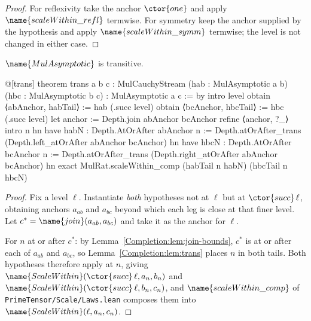 \begin{proof}
For reflexivity take the anchor $\ctor{one}$ and apply
$\name{scaleWithin\_refl}$ termwise.  For symmetry keep the anchor supplied by
the hypothesis and apply $\name{scaleWithin\_symm}$ termwise; the level is not
changed in either case.
\end{proof}

\begin{theorem}\label{Completion:thm:trans}
$\name{MulAsymptotic}$ is transitive.
\end{theorem}

\begin{leancode}
@[trans] theorem trans {a b c : MulCauchyStream}
    (hab : MulAsymptotic a b) (hbc : MulAsymptotic b c) :
    MulAsymptotic a c := by
  intro level
  obtain ⟨abAnchor, habTail⟩ := hab (.succ level)
  obtain ⟨bcAnchor, hbcTail⟩ := hbc (.succ level)
  let anchor := Depth.join abAnchor bcAnchor
  refine ⟨anchor, ?_⟩
  intro n hn
  have habN : Depth.AtOrAfter abAnchor n :=
    Depth.atOrAfter_trans (Depth.left_atOrAfter abAnchor bcAnchor) hn
  have hbcN : Depth.AtOrAfter bcAnchor n :=
    Depth.atOrAfter_trans (Depth.right_atOrAfter abAnchor bcAnchor) hn
  exact MulRat.scaleWithin_comp (habTail n habN) (hbcTail n hbcN)
\end{leancode}

\begin{proof}
Fix a level $\ell$.  Instantiate \emph{both} hypotheses not at $\ell$ but at
$\ctor{succ}\,\ell$, obtaining anchors $a_{ab}$ and $a_{bc}$ beyond which each
leg is close at that finer level.  Let $c^{*} = \name{join}(a_{ab}, a_{bc})$ and
take it as the anchor for $\ell$.

For $n$ at or after $c^{*}$: by Lemma~\ref{Completion:lem:join-bounds}, $c^{*}$
is at or after each of $a_{ab}$ and $a_{bc}$, so
Lemma~\ref{Completion:lem:trans} places $n$ in both tails.  Both hypotheses
therefore apply at $n$, giving
$\name{ScaleWithin}(\ctor{succ}\,\ell, a_n, b_n)$ and
$\name{ScaleWithin}(\ctor{succ}\,\ell, b_n, c_n)$, and
$\name{scaleWithin\_comp}$ of \texttt{PrimeTensor/Scale/Laws.lean} composes
them into $\name{ScaleWithin}(\ell, a_n, c_n)$.
\end{proof}

